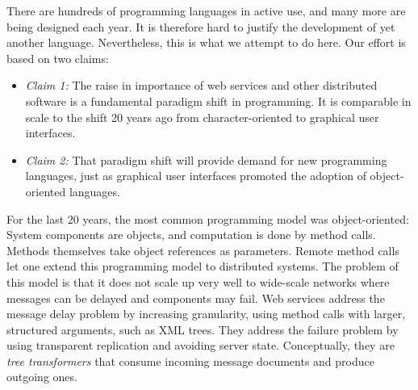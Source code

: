 
There are hundreds of programming languages in active use, and many
more are being designed each year. It is therefore hard to justify the
development of yet another language. Nevertheless, this is what we
attempt to do here.  Our effort is based on two claims:
\begin{itemize}
\item[] {\em Claim 1:} The raise in importance of web services and
other distributed software is a fundamental paradigm
shift in programming. It is comparable in scale to the shift 20 years ago
from character-oriented to graphical user interfaces.
\item[] {\em Claim 2:} That paradigm shift will provide demand
for new programming languages, just as graphical user interfaces
promoted the adoption of object-oriented languages.
\end{itemize}
For the last 20 years, the most common programming model was
object-oriented: System components are objects, and computation is
done by method calls.  Methods themselves take object references as
parameters. Remote method calls let one extend this programming model
to distributed systems. The problem of this model is that it does not
scale up very well to wide-scale networks where messages can be
delayed and components may fail. Web services address the message
delay problem by increasing granularity, using method calls with
larger, structured arguments, such as XML trees.  They address the
failure problem by using transparent replication and avoiding server
state.  Conceptually, they are {\em tree transformers} that consume
incoming message documents and produce outgoing ones.  

